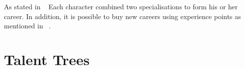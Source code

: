 As stated in ~ Each character combined two specialisations to form his or her career. In addition, it is
possible to buy new careers using experience points as mentioned in ~.

\begin{multicols}{2}

\ambassadorDescription
\arcanaDescription
\archerDescription
\assassinDescription
\beastRiderDescription
\gameHunterDescription
\charmerDescription
\duneTraderDescription
\gladiatorDescription
\mercenaryDescription
\performerDescription
\doctorDescription
\primalDescription
\psionDescription
\scholarDescription
\scoutDescription
\thiefDescription
\thugDescription

\end{multicols}

\section{Talent Trees}

\ambassadorTree
\arcanaTree
\archerTree
\assassinTree
\beastRiderTree
\gameHunterTree
\charmerTree
\duneTraderTree
\gladiatorTree
\mercenaryTree
\performerTree
\doctorTree
\primalTree
\psionTree
\scholarTree
\scoutTree
\thiefTree
\thugTree
